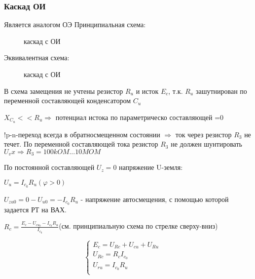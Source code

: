 \subsubsection{Каскад ОИ}

Является аналогом ОЭ
Принципиальная схема:
\begin{center}
	\begin{figure}[h!]
		\caption{каскад с ОИ}
	\end{figure}
\end{center}

Эквивалентная схема:
\begin{center}
	\begin{figure}[h!]
		\caption{каскад с ОИ}
	\end{figure}
\end{center}

В схема замещения не учтены резистор $R_u$ и исток $E_c$, т.к. $R_u$ зашутнирован по переменной составляющей конденсатором $C_u$

$X_{C_u}<<R_u\Rightarrow$ потенциал истока по параметрическо составляющей =0

!p-n-переход всегда в обратносмещенном состоянии $\Rightarrow$ ток через резистор $R_3$ не течет. По переменной составляющей тока резистор $R_3$ не должен шунтировать $U_vx \Rightarrow R_3=100kOM...10MOM$ 

По постоянной составляющей $U_z=0$
напряжение U-земля:

$U_u=I_{c_0}R_u(\varphi>0)$

$U_{zu0}=0-U_{u0}=-I_{c_0}R_u$ - напряжение автосмещения, с помощью которой задается РТ на ВАХ.

$R_c=\frac{E_c-U_{cu_0}-I_{c_0}R_u}{I_{c_0}}$(см. принципиальную схема по стрелке сверху-вниз)

$$ \left\{
\begin{aligned}
E_c=U_{Rc}+U_{cu}+U_{Ru}\\
U_{Rc}  = R_cI_{c_0} & &\\
U_{ru} = I_{c_0}R_u & &\\
\end{aligned}
\right. $$

\begin{center}
	\begin{figure}[h!]
	\end{figure}
\end{center}
\pagebreak
\begin{center}
	\begin{figure}[h!]
	\end{figure}
\end{center}

